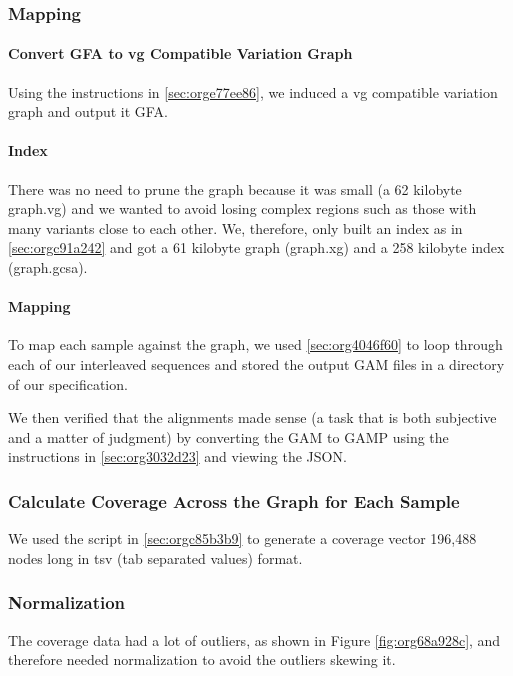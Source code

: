 \documentclass[10pt, a4paper]{article}
\begin{document}
\subsubsection{Mapping}
\label{sec:orgbfc4b12}
\paragraph{Convert GFA to vg Compatible Variation Graph}
\label{sec:orge74585a}
Using the instructions in \ref{sec:orge77ee86}, we induced a vg 
\cite{garrisonVariationGraphToolkit2018} compatible variation graph and output it 
GFA.

\paragraph{Index}
\label{sec:orgb859e03}
There was no need to prune the graph because it was small 
(a 62 kilobyte graph.vg) and we wanted to avoid losing complex regions such as 
those with many variants close to each other.
We, therefore, only built an index as in \ref{sec:orgc91a242} and got a 61
kilobyte graph (graph.xg) and a 258 kilobyte index (graph.gcsa).

\paragraph{Mapping}
\label{sec:org8b6399c}
To map each sample against the graph, we used \ref{sec:org4046f60} to loop through 
each of our interleaved sequences and stored the output GAM files in a 
directory of our specification.

We then verified that the alignments made sense
(a task that is both subjective and a matter of judgment) by converting the GAM 
to GAMP using the instructions in  \ref{sec:org3032d23} and viewing the JSON.

\subsubsection{Calculate Coverage Across the Graph for Each Sample}
\label{sec:org34a8932}
We used the script in \ref{sec:orgc85b3b9} to generate a coverage vector 196,488 nodes
long in tsv (tab separated values) format.

\subsubsection{Normalization}
\label{sec:org33e9040}
The coverage data had a lot of outliers, as shown in Figure
\ref{fig:org68a928c}, and therefore needed normalization to avoid the outliers
skewing it.
\end{document}

